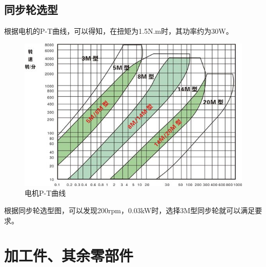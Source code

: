 \documentclass[12pt]{article}
\begin{document}
\begin{CJK}{UTF8}{gbsn}
\subsection{同步轮选型}
根据电机的P-T曲线，可以得知，在扭矩为1.5N.m时，其功率约为30W。
 \begin{figure}[H]
\centering
\includegraphics[width=.8\textwidth]{chap3//fig9.jpg}
\caption{电机P-T曲线}
\end{figure}
根据同步轮选型图，可以发现200rpm，0.03kW时，选择3M型同步轮就可以满足要求。


\section{加工件、其余零部件}

\end{CJK}
\end{document}
